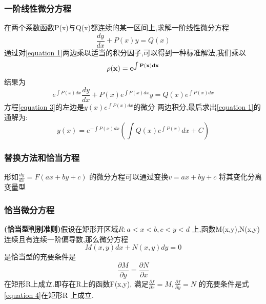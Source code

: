 \documentclass{article}
\begin{document}
\subsubsection{一阶线性微分方程}
\begin{theorem}
  在两个系数函数P(x)与Q(x)都连续的某一区间上,求解一阶线性微分方程
  \begin{equation}
    \frac{dy}{dx}+P(x)y=Q(x)
    \label{equation 1}
  \end{equation}
  通过对\ref{equation 1}两边乘以适当的积分因子,可以得到一种标准解法,我们乘以
  \begin{equation}
   {\bf  \rho(x)=e^{\int P(x)dx}}
    \label{equation 2}
  \end{equation}
 结果为
 \begin{equation}
    e^{\int P(x)dx} \frac{dy}{dx}+P(x)e^{\int P(x)dx}y=Q(x)e^{\int P(x)dx}
    \label{equation 3}
  \end{equation}
  方程\ref{equation 3}的左边是$y(x)e^{\int P(x)dx}$的微分
  两边积分,最后求出\ref{equation 1}的通解为:
  \begin{equation}
    y(x)=e^{-\int P(x)dx}({\int {Q(x)e^{\int P(x)}dx} }+C)
  \end{equation}
\end{theorem}

\subsubsection{替换方法和恰当方程}
\begin{theorem}
  形如$\frac{dy}{dx}=F(ax+by+c)$ 的微分方程可以通过变换$v=ax+by+c$ 将其变化分离变量型
\end{theorem}
\subsubsection{恰当微分方程}
\begin{theorem}
  {\bf (恰当型判别准则)}假设在矩形开区域$R:a<x<b,c<y<d$ 上,函数M(x,y),N(x,y)连续且有连续一阶偏导数,那么微分方程
  \begin{equation}
  M(x,y)dx+N(x,y)dy=0
\end{equation}
是恰当型的充要条件是
\begin{equation}
  \frac{\partial M}{\partial y}=\frac{\partial N}{\partial x}
  \label{equation 4}
\end{equation}
在矩形R上成立.即存在R上的函数F(x,y), 满足$\frac{\partial f}{\partial x}=M,\frac{\partial f}{\partial y}=N$ 的充要条件是式\ref{equation 4}在矩形R 上成立.
\end{theorem}
\end{document}
